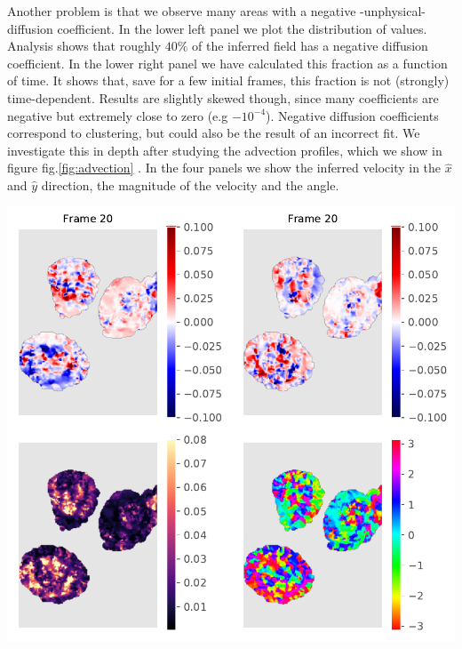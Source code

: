 \documentclass{Dissertate}
\let\origfigure\figure
\let\endorigfigure\endfigure
\renewenvironment{figure}[1][2] {
    \expandafter\origfigure\expandafter[H]
} {
    \endorigfigure
}
\begin{document}
Another problem is that we observe many areas with a negative
-unphysical- diffusion coefficient. In the lower left panel we plot the
distribution of values. Analysis shows that roughly \(40\%\) of the
inferred field has a negative diffusion coefficient. In the lower right
panel we have calculated this fraction as a function of time. It shows
that, save for a few initial frames, this fraction is not (strongly)
time-dependent. Results are slightly skewed though, since many
coefficients are negative but extremely close to zero (e.g
\(-10^{-4}\)). Negative diffusion coefficients correspond to clustering,
but could also be the result of an incorrect fit. We investigate this in
depth after studying the advection profiles, which we show in figure
fig.\ref{fig:advection} . In the four panels we show the inferred
velocity in the \(\hat{x}\) and \(\hat{y}\) direction, the magnitude of
the velocity and the angle.

\begin{figure}
\hypertarget{fig:advection}{%
\centering
\includegraphics{source/figures/pdf/Fit_LSconstrainedadvection.pdf}
\caption{Analysis of the velocity fields. The upper rows show
respectively \(v_x\) and \(v_y\), wwhile the lower row shows the
magnitude and angle.}\label{fig:advection}
}
\end{figure}
\end{document}
